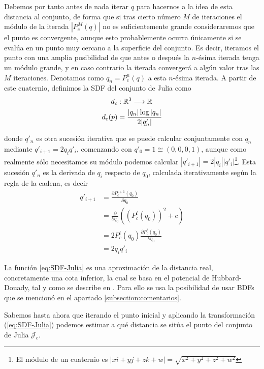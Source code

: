 Debemos por tanto antes de nada iterar $q$ para hacernos a la idea de esta distancia al conjunto, de forma que si tras cierto número $M$ de iteraciones el módulo de la iterada $|P_c^M(q)|$ no es suficientemente grande consideraremos que el punto es convergente, aunque esto probablemente ocurra únicamente si se evalúa en un punto muy cercano a la superficie del conjunto. Es decir, iteramos el punto con una amplia posibilidad de que antes o después la $n$-ésima iterada tenga un módulo grande, y en caso contrario la iterada convergerá a algún valor tras las $M$ iteraciones. Denotamos como $q_n=P_c^n(q)$ a esta $n$-ésima iterada. A partir de este cuaternio, definimos la SDF del conjunto de Julia como 
\begin{equation}
    \label{eq:SDF-Julia}
    \begin{split}
        d_c&:\mathbb{R}^3\longrightarrow\mathbb{R} \\
        d_c(p) &= \dfrac{|q_n|\log|q_n|}{2|q'_n|}
    \end{split}
\end{equation}

donde $q'_n$ es otra sucesión iterativa que se puede calcular conjuntamente con $q_n$ mediante $q'_{i+1}=2q_i q'_i$, comenzando con $q'_0=1\cong(0,0,0,1)$, aunque como realmente sólo necesitamos su módulo podemos calcular $|q'_{i+1}|=2|q_i||q'_i|$\footnote{El módulo de un cuaternio es $|xi+yj+zk+w|=\sqrt{x^2+y^2+z^2+w^2}$}. Esta sucesión $q'_n$ es la derivada de $q_i$ respecto de $q_0$, calculada iterativamente según la regla de la cadena, es decir
\begin{equation}
    \begin{split}
        q'_{i+1}&=\frac{\partial P^{i+1}_c(q_0)}{\partial q_0}\\
        &= \frac{\partial}{\partial q_0}\left((P_c^i(q_0))^2+c\right)\\
        &= 2 P_c^i(q_0)\frac{\partial P_c^i(q_0)}{\partial q_0}\\
        &= 2 q_i q'_i
    \end{split}
\end{equation}

La función \ref{eq:SDF-Julia} es una aproximación de la distancia real, concretamente una cota inferior, la cual se basa en el potencial de Hubbard-Douady, tal y como se describe en \cite[Capítulo 8]{Hubbard-Douady}. Para ello se usa la posibilidad de usar BDFs que se mencionó en el apartado \ref{subsection:comentarios}.

Sabemos hasta ahora que iterando el punto inicial y aplicando la transformación (\ref{eq:SDF-Julia}) podemos estimar a qué distancia se sitúa el punto del conjunto de Julia $\mathcal{J}_c$. 

